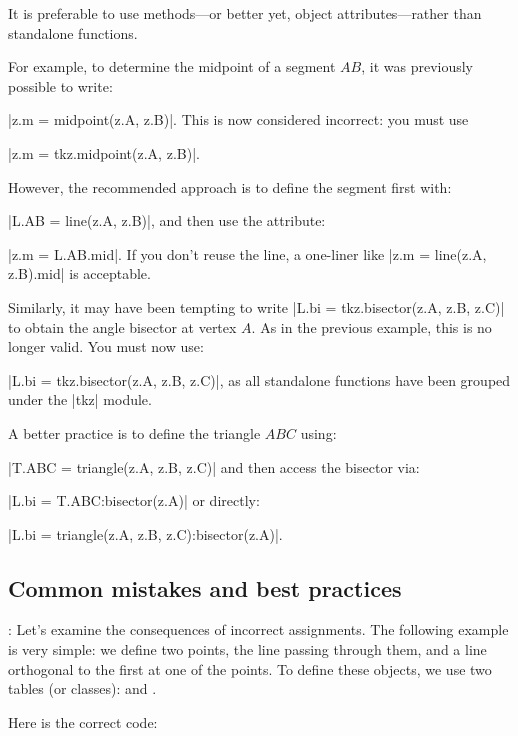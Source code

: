 It is preferable to use methods—or better yet, object attributes—rather than standalone functions.

For example, to determine the midpoint of a segment $AB$, it was previously possible to write:

|z.m = midpoint(z.A, z.B)|.  This is now considered incorrect: you must use

|z.m = tkz.midpoint(z.A, z.B)|.

However, the recommended approach is to define the segment first with:

|L.AB = line(z.A, z.B)|, and then use the attribute:

|z.m = L.AB.mid|. If you don't reuse the line, a one-liner like |z.m = line(z.A, z.B).mid| is acceptable.

\vspace{12pt}
Similarly, it may have been tempting to write |L.bi = tkz.bisector(z.A, z.B, z.C)| to obtain the angle bisector at vertex $A$. As in the previous example, this is no longer valid. You must now use:

|L.bi = tkz.bisector(z.A, z.B, z.C)|, as all standalone functions have been grouped under the |tkz| module.

A better practice is to define the triangle $ABC$ using:

|T.ABC = triangle(z.A, z.B, z.C)| and then access the bisector via:

|L.bi = T.ABC:bisector(z.A)| or directly:

|L.bi = triangle(z.A, z.B, z.C):bisector(z.A)|.

\subsection{Common mistakes and best practices}

\vspace{1em}
\tkzRHand{\textcolor{red}{Second Warning}}: Let's examine the consequences of incorrect assignments. The following example is very simple: we define two points, the line passing through them, and a line orthogonal to the first at one of the points. To define these objects, we use two tables (or classes):  and .

Here is the correct code:
\begin{mybox}{}
\begin{tkzexample}[latex=.5\textwidth]
\end{tkzexample}
\end{mybox}

